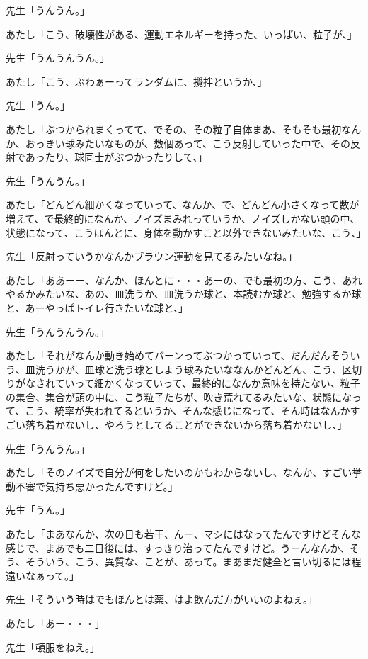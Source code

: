 \documentclass[b5j,twoside,twocolumn]{utarticle}
\begin{document}
\begin{description}
\item 先生「うんうん。」
\item あたし「こう、破壊性がある、運動エネルギーを持った、いっぱい、粒子が、」
\item 先生「うんうんうん。」
\item あたし「こう、ぶわぁーってランダムに、攪拌というか、」
\item 先生「うん。」
\item あたし「ぶつかられまくってて、でその、その粒子自体まあ、そもそも最初なんか、おっきい球みたいなものが、数個あって、こう反射していった中で、その反射であったり、球同士がぶつかったりして、」
\item 先生「うんうん。」
\item あたし「どんどん細かくなっていって、なんか、で、どんどん小さくなって数が増えて、で最終的になんか、ノイズまみれっていうか、ノイズしかない頭の中、状態になって、こうほんとに、身体を動かすこと以外できないみたいな、こう、」
\item 先生「反射っていうかなんかブラウン運動を見てるみたいなね。」
\item あたし「ああーー、なんか、ほんとに・・・あーの、でも最初の方、こう、あれやるかみたいな、あの、皿洗うか、皿洗うか球と、本読むか球と、勉強するか球と、あーやっぱトイレ行きたいな球と、」
\item 先生「うんうんうん。」
\item あたし「それがなんか動き始めてバーンってぶつかっていって、だんだんそういう、皿洗うかが、皿球と洗う球としよう球みたいななんかどんどん、こう、区切りがなされていって細かくなっていって、最終的になんか意味を持たない、粒子の集合、集合が頭の中に、こう粒子たちが、吹き荒れてるみたいな、状態になって、こう、統率が失われてるというか、そんな感じになって、そん時はなんかすごい落ち着かないし、やろうとしてることができないから落ち着かないし、」
\item 先生「うんうん。」
\item あたし「そのノイズで自分が何をしたいのかもわからないし、なんか、すごい挙動不審で気持ち悪かったんですけど。」
\item 先生「うん。」
\item あたし「まあなんか、次の日も若干、んー、マシにはなってたんですけどそんな感じで、まあでも二日後には、すっきり治ってたんですけど。うーんなんか、そう、そういう、こう、異質な、ことが、あって。まあまだ健全と言い切るには程遠いなぁって。」
\item 先生「そういう時はでもほんとは薬、はよ飲んだ方がいいのよねぇ。」
\item あたし「あー・・・」
\item 先生「頓服をねえ。」

\end{description}
\end{document}
